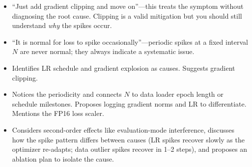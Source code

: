\begin{interviewq}
\redflags
\begin{itemize}
    \item ``Just add gradient clipping and move on''---this treats the symptom without diagnosing the root cause. Clipping is a valid mitigation but you should still understand \textit{why} the spikes occur.
    \item ``It is normal for loss to spike occasionally''---periodic spikes at a fixed interval $N$ are never normal; they always indicate a systematic issue.
\end{itemize}


\goodgreat
\begin{itemize}
    \item {} Identifies LR schedule and gradient explosion as causes. Suggests gradient clipping.
    \item {} Notices the periodicity and connects $N$ to data loader epoch length or schedule milestones. Proposes logging gradient norms and LR to differentiate. Mentions the FP16 loss scaler.
    \item {} Considers second-order effects like evaluation-mode interference, discusses how the spike pattern differs between causes (LR spikes recover slowly as the optimizer re-adapts; data outlier spikes recover in 1--2 steps), and proposes an ablation plan to isolate the cause.
\end{itemize}

\end{interviewq}

